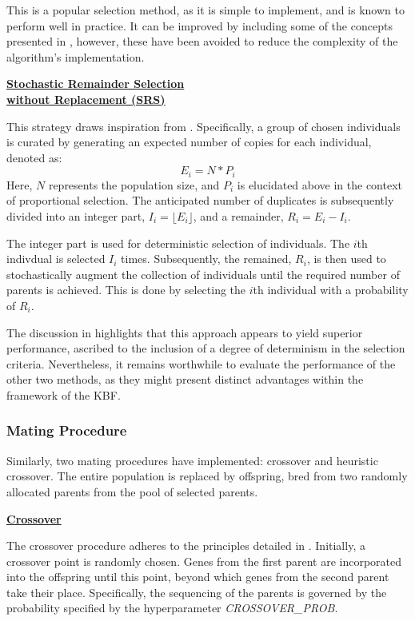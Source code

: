 \documentclass[10pt]{article}
\begin{document}
\begin{multicols}{2}
This is a popular selection method, as it is simple to implement, and is known to perform well in practice. It can be improved by including some of the concepts presented in \cite{Miller1995GeneticAT}, however, these have been avoided to reduce the complexity of the algorithm's implementation.

\textbf{\underline{Stochastic Remainder Selection}}\\\vspace{0.5mm}
\textbf{\underline{\hspace{-0.5mm}without Replacement (SRS)}}

This strategy draws inspiration from \cite{parks2023geneticalgorithms}. Specifically, a group of chosen individuals is curated by generating an expected number of copies for each individual, denoted as: 
\[E_i = N * P_i\]
Here, \(N\) represents the population size, and \(P_i\) is elucidated above in the context of proportional selection. The anticipated number of duplicates is subsequently divided into an integer part, \(I_i = \lfloor E_i \rfloor\), and a remainder, \(R_i = E_i - I_i\). 

The integer part is used for deterministic selection of individuals. The $i$th indivdual is selected $I_i$ times. Subsequently, the remained, $R_i$, is then used to stochastically augment the collection of individuals until the required number of parents is achieved. This is done by selecting the $i$th individual with a probability of $R_i$.

The discussion in \cite{parks2023geneticalgorithms} highlights that this approach appears to yield superior performance, ascribed to the inclusion of a degree of determinism in the selection criteria. Nevertheless, it remains worthwhile to evaluate the performance of the other two methods, as they might present distinct advantages within the framework of the KBF.

\subsubsection{Mating Procedure}

Similarly, two mating procedures have implemented: crossover and heuristic crossover. The entire population is replaced by offspring, bred from two randomly allocated parents from the pool of selected parents.

\textbf{\underline{Crossover}}

The crossover procedure adheres to the principles detailed in \cite{parks2023geneticalgorithms}. Initially, a crossover point is randomly chosen. Genes from the first parent are incorporated into the offspring until this point, beyond which genes from the second parent take their place. Specifically, the sequencing of the parents is governed by the probability specified by the hyperparameter \textit{CROSSOVER\_PROB}.


\end{multicols}
\end{document}
